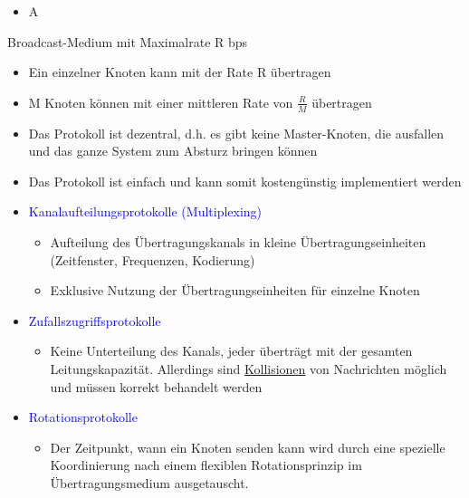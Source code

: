 
\begin{itemize}
    \item \todo A
\end{itemize}

Broadcast-Medium mit Maximalrate R bps
\begin{itemize}
    \item Ein einzelner Knoten kann mit der Rate R übertragen
    \item M Knoten können mit einer mittleren Rate von $\frac{R}{M}$ übertragen
    \item Das Protokoll ist dezentral, d.h. es gibt keine Master-Knoten, die ausfallen und das ganze System zum Absturz bringen können
    \item Das Protokoll ist einfach und kann somit kostengünstig implementiert werden
\end{itemize}

\begin{itemize}
    \item \textcolor{blue}{Kanalaufteilungsprotokolle (Multiplexing)}
    \begin{itemize}
        \item Aufteilung des Übertragungskanals in kleine Übertragungseinheiten (Zeitfenster, Frequenzen, Kodierung)
        \item Exklusive Nutzung der Übertragungseinheiten für einzelne Knoten
    \end{itemize}
    \item \textcolor{blue}{Zufallszugriffsprotokolle}
    \begin{itemize}
        \item Keine Unterteilung des Kanals, jeder überträgt mit der gesamten Leitungskapazität.
        Allerdings sind \underline{Kollisionen} von Nachrichten möglich und müssen korrekt behandelt werden
    \end{itemize}
    \item \textcolor{blue}{Rotationsprotokolle}
    \begin{itemize}
        \item Der Zeitpunkt, wann ein Knoten senden kann wird durch eine spezielle Koordinierung nach einem flexiblen Rotationsprinzip im Übertragungsmedium ausgetauscht.
    \end{itemize}
\end{itemize}

